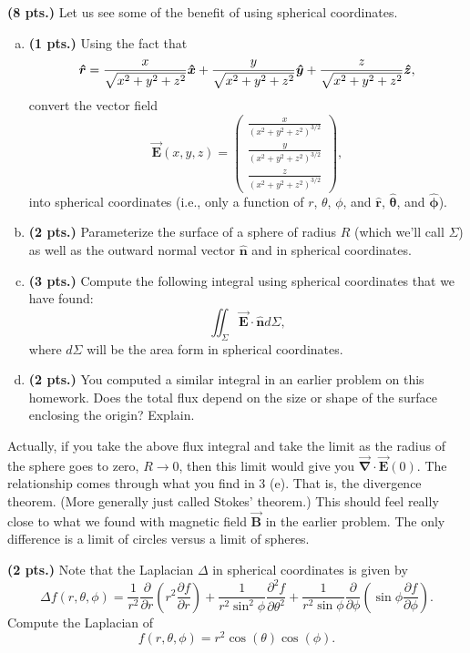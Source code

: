 \documentclass[12pt]{article} %
\newcommand{\grad}{\boldsymbol{\vec{\nabla}}}
\newcommand{\vecfieldE}{\boldsymbol{\vec{E}}}
\newcommand{\rhat}{\boldsymbol{\hat{r}}}
\newcommand{\thetahat}{\boldsymbol{\hat{\theta}}}
\newcommand{\phihat}{\boldsymbol{\hat{\phi}}}
\newcommand{\unitvec}{\boldsymbol{\hat{n}}}
\newcommand{\vecfieldB}{\boldsymbol{\vec{B}}}
\begin{document}
\begin{problem}
	\textbf{(8 pts.)} Let us see some of the benefit of using spherical coordinates. 
	\begin{enumerate}[(a)]
		\item \textbf{(1 pts.)} Using the fact that 
		\[
		\rhat = \frac{x}{\sqrt{x^2+y^2+z^2}}\xhat + \frac{y}{\sqrt{x^2+y^2+z^2}}\yhat + \frac{z}{\sqrt{x^2+y^2+z^2}}\zhat,
		\]
		convert the vector field 
		\[
		\vecfieldE(x,y,z) = \begin{pmatrix} \frac{x}{(x^2+y^2+z^2)^{3/2}} \\ \frac{y}{(x^2+y^2+z^2)^{3/2}} \\ \frac{z}{(x^2+y^2+z^2)^{3/2}} \end{pmatrix},
		\] into spherical coordinates (i.e., only a function of $r$, $\theta$, $\phi$, and $\rhat$, $\thetahat$, and $\phihat$).
		\item \textbf{(2 pts.)} Parameterize the surface of a sphere of radius $R$ (which we'll call $\Sigma$) as well as the outward normal vector $\unitvec$ and  in spherical coordinates.
		\item \textbf{(3 pts.)} Compute the following integral using spherical coordinates that we have found:
		\[
		\iint_\Sigma \vecfieldE \cdot \unitvec d\Sigma,
		\]
		where $d\Sigma$ will be the area form in spherical coordinates.
		\item \textbf{(2 pts.)} You computed a similar integral in an earlier problem on this homework. Does the total flux depend on the size or shape of the surface enclosing the origin? Explain.
	\end{enumerate}
\begin{remark}
	Actually, if you take the above flux integral and take the limit as the radius of the sphere goes to zero, $R\to 0$, then this limit would give you $\grad \cdot \vecfieldE(0)$. The relationship comes through what you find in 3 (e). That is, the divergence theorem. (More generally just called Stokes' theorem.) This should feel really close to what we found with magnetic field $\vecfieldB$ in the earlier problem. The only difference is a limit of circles versus a limit of spheres.
	\end{remark}
\end{problem}

\vspace*{.5cm}

\begin{problem}
	\textbf{(2 pts.)} Note that the Laplacian $\Delta$ in spherical coordinates is given by
	\[
	\Delta f(r,\theta,\phi) = \frac{1}{r^2} \frac{\partial}{\partial r} \left(r^2 \frac{\partial f}{\partial r}\right)+\frac{1}{r^2 \sin^2 \phi} \frac{\partial^2 f}{\partial \theta^2} + \frac{1}{r^2 \sin\phi}\frac{\partial}{\partial \phi} \left(\sin \phi \frac{\partial f}{\partial \phi}\right).
	\]
	Compute the Laplacian of
	\[
	f(r,\theta,\phi) = r^2 \cos(\theta)\cos(\phi).
	\]
\end{problem}
\end{document}
